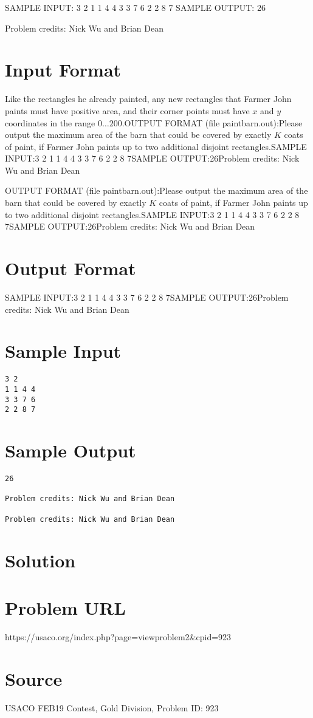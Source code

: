 \documentclass[12pt]{article}
\begin{document}
SAMPLE INPUT:
3 2
1 1 4 4
3 3 7 6
2 2 8 7
SAMPLE OUTPUT: 
26


Problem credits: Nick Wu and Brian Dean



\section*{Input Format}
Like the rectangles he already painted, any new rectangles that Farmer John
paints must have positive area, and their corner points must have $x$ and $y$
coordinates in the range $0 \ldots 200$.OUTPUT FORMAT (file paintbarn.out):Please output the maximum area of the barn that could be covered by  exactly $K$
coats of paint, if Farmer John paints up to two additional disjoint rectangles.SAMPLE INPUT:3 2
1 1 4 4
3 3 7 6
2 2 8 7SAMPLE OUTPUT:26Problem credits: Nick Wu and Brian Dean

OUTPUT FORMAT (file paintbarn.out):Please output the maximum area of the barn that could be covered by  exactly $K$
coats of paint, if Farmer John paints up to two additional disjoint rectangles.SAMPLE INPUT:3 2
1 1 4 4
3 3 7 6
2 2 8 7SAMPLE OUTPUT:26Problem credits: Nick Wu and Brian Dean

\section*{Output Format}
SAMPLE INPUT:3 2
1 1 4 4
3 3 7 6
2 2 8 7SAMPLE OUTPUT:26Problem credits: Nick Wu and Brian Dean

\section*{Sample Input}
\begin{verbatim}
3 2
1 1 4 4
3 3 7 6
2 2 8 7
\end{verbatim}

\section*{Sample Output}
\begin{verbatim}
26

Problem credits: Nick Wu and Brian Dean

Problem credits: Nick Wu and Brian Dean
\end{verbatim}

\section*{Solution}


\section*{Problem URL}
https://usaco.org/index.php?page=viewproblem2&cpid=923

\section*{Source}
USACO FEB19 Contest, Gold Division, Problem ID: 923
\end{document}
